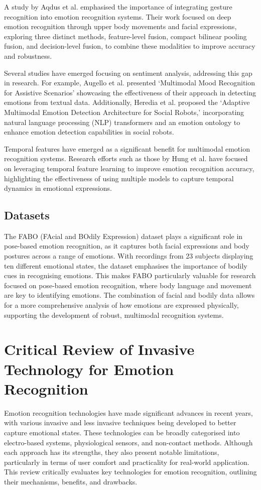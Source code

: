 A study by Aqdus et al. \cite{Aqdus2021-xr} emphasised the importance of integrating gesture recognition into emotion recognition systems. Their work focused on deep emotion recognition through upper body movements and facial expressions, exploring three distinct methods, feature-level fusion, compact bilinear pooling fusion, and decision-level fusion, to combine these modalities to improve accuracy and robustness.

Several studies have emerged focusing on sentiment analysis, addressing this gap in research. For example, Augello et al. \cite{Augello2022-zy} presented `Multimodal Mood Recognition for Assistive Scenarios' showcasing the effectiveness of their approach in detecting emotions from textual data. Additionally, Heredia et al. \cite{Heredia2022-dt} proposed the `Adaptive Multimodal Emotion Detection Architecture for Social Robots,' incorporating natural language processing (NLP) transformers and an emotion ontology to enhance emotion detection capabilities in social robots.

Temporal features have emerged as a significant benefit for multimodal emotion recognition systems. Research efforts such as those by Hung et al. \cite{Hung2020-gm} have focused on leveraging temporal feature learning to improve emotion recognition accuracy, highlighting the effectiveness of using multiple models to capture temporal dynamics in emotional expressions.

\subsection{Datasets}

The FABO (FAcial and BOdily Expression) dataset \cite{1699093} plays a significant role in pose-based emotion recognition, as it captures both facial expressions and body postures across a range of emotions. With recordings from 23 subjects displaying ten different emotional states, the dataset emphasises the importance of bodily cues in recognising emotions. This makes FABO particularly valuable for research focused on pose-based emotion recognition, where body language and movement are key to identifying emotions. The combination of facial and bodily data allows for a more comprehensive analysis of how emotions are expressed physically, supporting the development of robust, multimodal recognition systems.

\section{Critical Review of Invasive Technology for Emotion Recognition}
Emotion recognition technologies have made significant advances in recent years, with various invasive and less invasive techniques being developed to better capture emotional states. These technologies can be broadly categorised into electro-based systems, physiological sensors, and non-contact methods. Although each approach has its strengths, they also present notable limitations, particularly in terms of user comfort and practicality for real-world application. This review critically evaluates key technologies for emotion recognition, outlining their mechanisms, benefits, and drawbacks.

